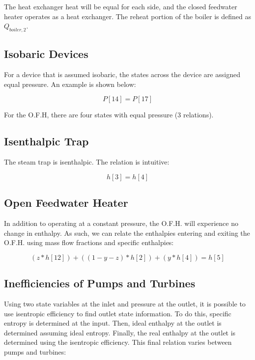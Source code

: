 \documentclass[10pt,cleanfoot]{asme2ej}
\begin{document}
The heat exchanger heat will be equal for each side, and the closed feedwater heater operates as a heat exchanger. The reheat portion of the boiler is defined as $Q_{boiler,2}$.

\subsection{Isobaric Devices}

For a device that is assumed isobaric, the states across the device are assigned equal pressure. An example is shown below:

\begin{equation}
P[14] = P[17]
\label{Isobaric device}
\end{equation}

For the O.F.H, there are four states with equal pressure (3 relations).

\subsection{Isenthalpic Trap}

The steam trap is isenthalpic. The relation is intuitive:

\begin{equation}
h[3] = h[4]
\label{Isobaric device}
\end{equation}

\subsection{Open Feedwater Heater}

In addition to operating at a constant pressure, the O.F.H. will experience no change in enthalpy. As such, we can relate the enthalpies entering and exiting the O.F.H. using mass flow fractions and specific enthalpies:

\begin{equation}
(z * h[12]) + ((1-y-z) * h[2]) + (y * h[4]) = h[5]
\label{O.F.H. enthalpies}
\end{equation}

\subsection{Inefficiencies of Pumps and Turbines}

Using two state variables at the inlet and pressure at the outlet, it is possible to use isentropic efficiency to find outlet state information. To do this, specific entropy is determined at the input. Then, ideal enthalpy at the outlet is determined assuming ideal entropy. Finally, the real enthalpy at the outlet is determined using the isentropic efficiency. This final relation varies between pumps and turbines:
\end{document}
